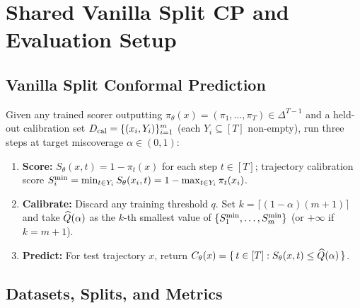 
\section{Shared Vanilla Split CP and Evaluation Setup} \label{sec:shared}

\subsection{Vanilla Split Conformal Prediction} \label{sec:vanilla-cp}

Given any trained scorer outputting $\pi_\theta(x)=(\pi_1,\dots,\pi_T)\in\Delta^{T-1}$ and a held-out calibration set $D_{\mathrm{cal}}=\{(x_i,Y_i)\}_{i=1}^m$ (each $Y_i\subseteq[T]$ non-empty), run three steps at target miscoverage $\alpha\in(0,1)$:
\begin{enumerate}
\item \textbf{Score:} $S_\theta(x,t) = 1 - \pi_t(x)$ for each step $t\in[T]$; trajectory calibration score $S^{\min}_i = \min_{t\in Y_i} S_\theta(x_i,t) = 1 - \max_{t\in Y_i}\pi_t(x_i)$.
\item \textbf{Calibrate:} Discard any training threshold $q$. Set $k=\lceil(1-\alpha)(m+1)\rceil$ and take $\widehat Q(\alpha)$ as the $k$-th smallest value of $\{S^{\min}_1,\dots,S^{\min}_m\}$ (or $+\infty$ if $k=m+1$).
\item \textbf{Predict:} For test trajectory $x$, return $C_\theta(x) = \{\,t\in[T] : S_\theta(x,t) \le \widehat Q(\alpha)\,\}$.
\end{enumerate}

\subsection{Datasets, Splits, and Metrics} \label{sec:datasets}

